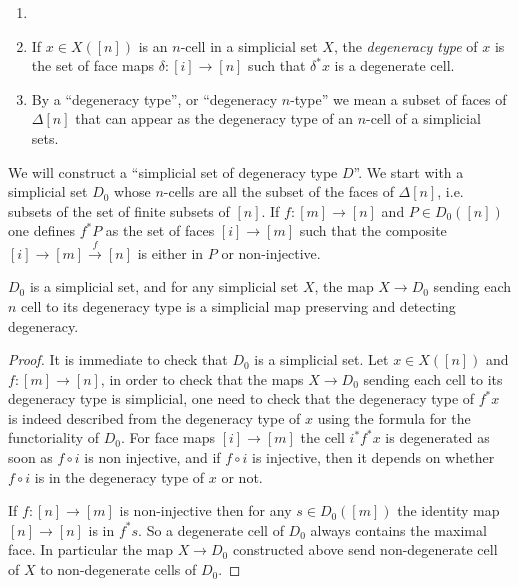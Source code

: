 \documentclass[reqno,10pt,a4paper,oneside,draft]{amsart}
\begin{document}
\begin{definition}

\begin{enumerate}
\item[]
\item If $x \in X([n])$ is an $n$-cell in a simplicial set $X$, the \emph{degeneracy type} of $x$ is the set of face maps $\delta:[i] \rightarrow [n]$ such that $\delta^* x$ is a degenerate cell.

\item By a ``degeneracy type'', or ``degeneracy $n$-type'' we mean a subset of faces of $\Delta[n]$ that can appear as the degeneracy type of an $n$-cell of a simplicial sets.

\end{enumerate}

\end{definition}

We will construct a ``simplicial set of degeneracy type $D$''. We start with a simplicial set $D_0$ whose $n$-cells are all the subset of the faces of $\Delta[n]$, i.e. subsets of the set of finite subsets of $[n]$. If $f : [m] \rightarrow [n]$ and $P \in D_0([n])$ one defines $f^* P$ as the set of faces  $[i] \rightarrow [m]$ such that the composite $[i] \rightarrow [m] \overset{f}{\rightarrow} [n]$ is either in $P$ or non-injective.

\begin{lemma}
$D_0$ is a simplicial set, and for any simplicial set $X$, the map $X \rightarrow D_0$ sending each $n$ cell to its degeneracy type is a simplicial map preserving and detecting degeneracy.
\end{lemma}

\begin{proof}
It is immediate to check that $D_0$ is a simplicial set. Let $x \in X([n])$ and $f:[m] \rightarrow [n]$, in order to check that the maps $X \rightarrow D_0$ sending each cell to its degeneracy type is simplicial, one need to check that the degeneracy type of $f^* x$ is indeed described from the degeneracy type of $x$ using the formula for the functoriality of $D_0$. For face maps $[i] \rightarrow [m]$ the cell $i^* f^* x$ is degenerated as soon as $f \circ i$ is non injective, and if $f\circ i$ is injective, then it depends on whether $f \circ i$ is in the degeneracy type of $x$ or not.

If $f:[n] \rightarrow [m]$ is non-injective then for any $s \in D_0([m])$ the identity map $[n] \rightarrow [n]$ is in $f^* s$. So a degenerate cell of $D_0$ always contains the maximal face. In particular the map $X \rightarrow D_0$ constructed above send non-degenerate cell of $X$ to non-degenerate cells of $D_0$.

\end{proof}
\end{document}
